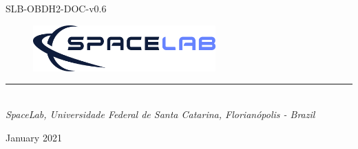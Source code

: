 %
%
%
%
%

%
%
%
%
%
%

\begin{titlepage}

\thispagestyle{empty}

\begin{flushleft}
SLB-OBDH2-DOC-v0.6
\end{flushleft}

\vspace{1cm}

\begin{figure}[!ht]
    \begin{flushleft}
        \includegraphics[width=7cm]{figures/spacelab-logo-full-color-rgb-1000px@72ppi.png}
    \end{flushleft}
\end{figure}

\begin{flushleft}
\Huge{\textbf{\thetitle}}
\rule[0pt]{\textwidth}{5pt}
\end{flushleft}

\vspace{0.2cm}

\begin{flushleft}
\textit{\thetitle} \\
\textit{SpaceLab, Universidade Federal de Santa Catarina, Florianópolis - Brazil}
\end{flushleft}

\vfill
\vfill

\begin{flushright}
January 2021
\end{flushright}

\end{titlepage}

